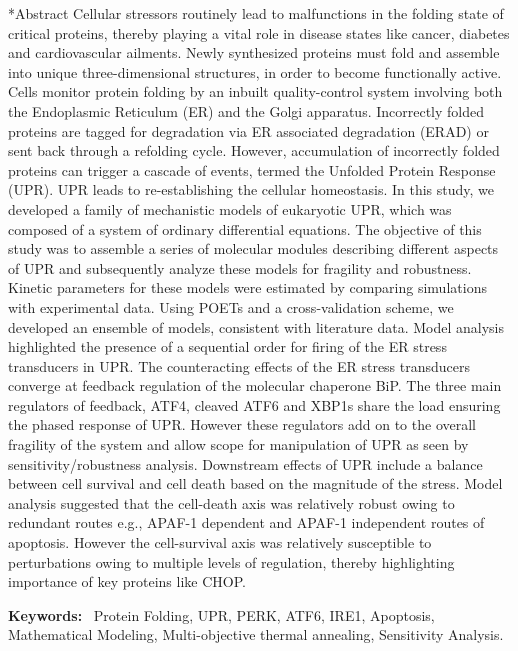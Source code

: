 \documentclass[12pt]{article}
\makeatletter
\renewcommand\section{\@startsection
	{subsection}{2}{0mm}
	{-0.2in}
	{0.05\baselineskip}
	{\normalfont\large\bfseries}}
\makeatother
\begin{document}
\section*{Abstract}
Cellular stressors routinely lead to malfunctions in the folding state of critical proteins, thereby playing a vital role in disease states like cancer, diabetes and cardiovascular ailments. Newly synthesized proteins must fold and assemble into unique three-dimensional structures, in order to become functionally active. Cells monitor protein folding by an inbuilt quality-control system involving both the Endoplasmic Reticulum (ER) and the Golgi apparatus. Incorrectly folded proteins are tagged for degradation via ER associated degradation (ERAD) or sent back through a refolding cycle. However, accumulation of incorrectly folded proteins can trigger a cascade of events, termed the Unfolded Protein Response (UPR). UPR leads to re-establishing the cellular homeostasis. %
In this study, we developed a family of mechanistic models of eukaryotic UPR, which was composed of a system of ordinary differential equations. The objective of this study was to assemble a series of molecular modules describing different aspects of UPR and subsequently analyze these models for fragility and robustness. Kinetic parameters for these models were estimated by comparing simulations with experimental data. Using POETs and a cross-validation scheme, we developed an ensemble of models, consistent with literature data. Model analysis highlighted the presence of a sequential order for firing of the ER stress transducers in UPR. The counteracting effects of the ER stress transducers converge at feedback regulation of the molecular chaperone BiP. The three main regulators of feedback, ATF4, cleaved ATF6 and XBP1s share the load ensuring the phased response of UPR. However these regulators add on to the overall fragility of the system and allow scope for manipulation of UPR as seen by sensitivity/robustness analysis. Downstream effects of UPR include a balance between cell survival and cell death based on the magnitude of the stress. Model analysis suggested that the cell-death axis was relatively robust owing to redundant routes e.g., APAF-1 dependent and APAF-1 independent routes of apoptosis. However the cell-survival axis was relatively susceptible to perturbations owing to multiple levels of regulation, thereby highlighting importance of key proteins like CHOP. 

\vspace{0.1in}
{\noindent \textbf{Keywords:}~ Protein Folding, UPR, PERK, ATF6, IRE1, Apoptosis, Mathematical Modeling, Multi-objective thermal annealing, Sensitivity Analysis.}
\end{document}
